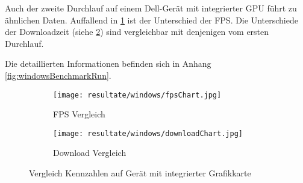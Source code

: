 Auch der zweite Durchlauf auf einem Dell-Gerät mit integrierter \gls{GPU} führt zu ähnlichen Daten. Auffallend in \ref{fig:benchmarkFpsChartWindows} ist der Unterschied der \gls{FPS}. Die Unterschiede der Downloadzeit (siehe \ref{fig:benchmarkDownloadChartWindows}) sind vergleichbar mit denjenigen vom ersten Durchlauf.

Die detaillierten Informationen befinden sich in Anhang \ref{fig:windowsBenchmarkRun}.

\begin{figure}[H]
  \centering
  \begin{subfigure}{.49\textwidth}
    \centering
    \texttt{[image: resultate/windows/fpsChart.jpg]}
    \caption{\gls{FPS} Vergleich}
    \label{fig:benchmarkFpsChartWindows}
  \end{subfigure}
  \begin{subfigure}{.49\textwidth}
    \centering
    \texttt{[image: resultate/windows/downloadChart.jpg]}
    \caption{Download Vergleich}
    \label{fig:benchmarkDownloadChartWindows}
  \end{subfigure}
  \caption{Vergleich Kennzahlen auf Gerät mit integrierter Grafikkarte}
  \label{fig:benchmarkChartWindows}
\end{figure}
